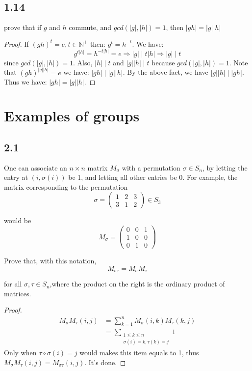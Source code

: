 \documentclass[a4paper, pdf, 12pt]{article}
\begin{document}
\subsection*{1.14} prove that if $g$ and $h$ commute, and
$gcd(|g|, |h|) = 1$, then $|gh| = |g||h|$
\begin{proof}
  If $(gh)^t = e, t\in \mathbb{N}^{+}$ then: $g^t = h^{-t}$. We have:
  $$
    g^{t|h| } = h^{-t|h| } = e \Rightarrow |g| \mid t|h| \Rightarrow |g| \mid t
  $$ since $gcd(|g|, |h|)=1$. Also, $|h| \mid t$ and $|g||h| \mid t$ because $gcd(|g|, |h|)=1$.
  Note that $(gh)^{|g||h|}=e$ we have: $|gh| \mid |g||h|$. By the above fact, we have $|g||h|\mid |gh|$. Thus
  we have: $|gh| = |g||h|$.
\end{proof}

\section*{Examples of groups}

\subsection*{2.1}
One can associate an $n \times n$ matrix $M_{\sigma}$ with a permutation $\sigma \in S_n$, by
letting the entry at $(i,\sigma(i))$ be 1, and letting all other entries be 0. For example,
the matrix corresponding to the permutation
$$
  \sigma = \begin{pmatrix}
    1 & 2 & 3 \\
    3 & 1 & 2
  \end{pmatrix} \in S_3
$$

\noindent would be
$$
  M_{\sigma} = \begin{pmatrix}
    0 & 0 & 1 \\
    1 & 0 & 0 \\
    0 & 1 & 0
  \end{pmatrix}
$$

\noindent Prove that, with this notation,
$$
  M_{\sigma\tau } = M_{\sigma}M_{\tau}
$$

\noindent for all $\sigma,\tau \in S_n$,where the product on the right is the ordinary product of matrices.

\begin{proof}
  $$
    \begin{aligned}
      M_\sigma M_\tau(i,j) & = \sum_{k = 1}^{n}M_{\sigma}(i,k)M_{\tau}(k,j) \\
                           & = \sum_{\substack{1\leq k\leq n                \\\sigma(i)=k, \tau(k)=j}}1
    \end{aligned}
  $$
  Only when $\tau\circ\sigma(i)=j$ would makes this item equals to 1, thus $M_{\sigma}M_{\tau}(i,j)=M_{\sigma\tau}(i,j)$. It's done.
\end{proof}
\end{document}
